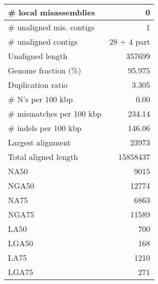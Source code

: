 \documentclass[12pt,a4paper]{article}
\begin{document}
\begin{table}[ht]
\begin{center}
\begin{tabular}{|l*{1}{|r}|}
\# local misassemblies & 0 \\ \hline
\# unaligned mis. contigs & 1 \\ \hline
\# unaligned contigs & 28 + 4 part \\ \hline
Unaligned length & 357699 \\ \hline
Genome fraction (\%) & 95.975 \\ \hline
Duplication ratio & 3.305 \\ \hline
\# N's per 100 kbp & 0.00 \\ \hline
\# mismatches per 100 kbp & 234.14 \\ \hline
\# indels per 100 kbp & 146.06 \\ \hline
Largest alignment & 23973 \\ \hline
Total aligned length & 15858437 \\ \hline
NA50 & 9015 \\ \hline
NGA50 & 12774 \\ \hline
NA75 & 6863 \\ \hline
NGA75 & 11589 \\ \hline
LA50 & 700 \\ \hline
LGA50 & 168 \\ \hline
LA75 & 1210 \\ \hline
LGA75 & 271 \\ \hline
\end{tabular}
\end{center}
\end{table}
\end{document}
